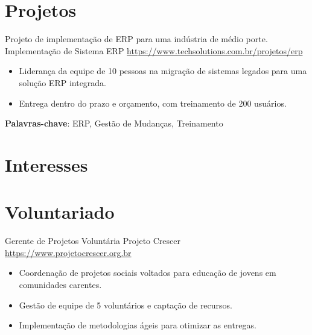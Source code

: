 \documentclass[a4paper, serif, 10pt]{moderncv}
\begin{document}
\section{Projetos}

        {Projeto de implementação de ERP para uma indústria de médio porte.}
        {Implementação de Sistema ERP}
        {\url{https://www.techsolutions.com.br/projetos/erp}}
        {}
        {\begin{itemize}
\item Liderança da equipe de 10 pessoas na migração de sistemas legados para uma solução ERP integrada.
\item Entrega dentro do prazo e orçamento, com treinamento de 200 usuários.
\end{itemize}
\textbf{Palavras-chave}: ERP, Gestão de Mudanças, Treinamento}
\section{Interesses}

\section{Voluntariado}

        {Gerente de Projetos Voluntária}
        {Projeto Crescer}
        {\url{https://www.projetocrescer.org.br}}
        {}
        {\begin{itemize}
\item Coordenação de projetos sociais voltados para educação de jovens em comunidades carentes.
\item Gestão de equipe de 5 voluntários e captação de recursos.
\item Implementação de metodologias ágeis para otimizar as entregas.
\end{itemize}}
    
\end{document}
